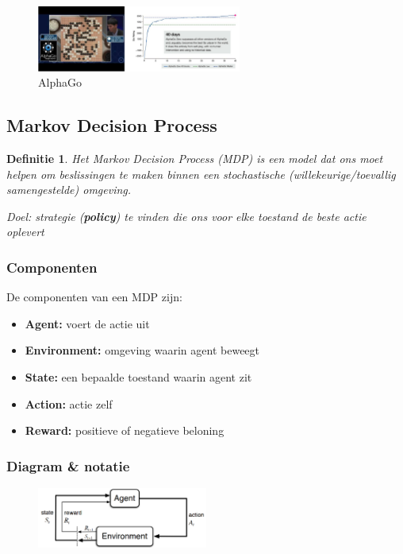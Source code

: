 \documentclass{article}
\newtheorem{theorem}{Definitie}[section]
\begin{document}
\begin{figure}[H]
    \centering
    \includegraphics[width=0.6\textwidth]{alphago.png}
    \caption{AlphaGo}
\end{figure}

\subsection{Markov Decision Process}

\begin{theorem}
    Het Markov Decision Process (MDP) is een model dat ons moet helpen om beslissingen
    te maken binnen een stochastische (willekeurige/toevallig samengestelde) omgeving.

    Doel: strategie (\textbf{policy}) te vinden die ons voor elke toestand de beste 
    actie oplevert
\end{theorem}

\subsubsection{Componenten}

De componenten van een MDP zijn:

\begin{itemize}
    \item \textbf{Agent:} voert de actie uit
    \item \textbf{Environment:} omgeving waarin agent beweegt
    \item \textbf{State:} een bepaalde toestand waarin agent zit
    \item \textbf{Action:} actie zelf
    \item \textbf{Reward:} positieve of negatieve beloning
\end{itemize}

\subsubsection{Diagram \& notatie}

\begin{figure}[H]
    \centering
    \includegraphics[width=0.5\textwidth]{mdp.png}
\end{figure}
\end{document}
